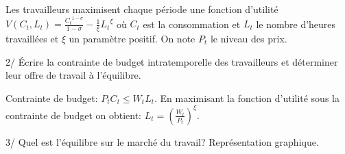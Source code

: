 \documentclass[
  letterpaper,
  DIV=11,
  numbers=noendperiod]{scrartcl}
\begin{document}
Les travailleurs maximisent chaque période une fonction d'utilité
\(V(C_t,L_t) = \frac{{C_t}^{1-\sigma}}{1-\sigma} - \frac{1}{\xi}{L_t}^{\xi}\)
où \(C_t\) est la consommation et \(L_t\) le nombre d'heures travaillées
et \(\xi\) un paramètre positif. On note \(P_t\) le niveau des prix.

2/ Écrire la contrainte de budget intratemporelle des travailleurs et
déterminer leur offre de travail à l'équilibre.

\begin{tcolorbox}[enhanced jigsaw, colbacktitle=quarto-callout-warning-color!10!white, rightrule=.15mm, left=2mm, leftrule=.75mm, colframe=quarto-callout-warning-color-frame, titlerule=0mm, colback=white, toptitle=1mm, bottomtitle=1mm, breakable, coltitle=black, title=\textcolor{quarto-callout-warning-color}{\faExclamationTriangle}\hspace{0.5em}{Correction}, bottomrule=.15mm, opacityback=0, arc=.35mm, toprule=.15mm, opacitybacktitle=0.6]

Contrainte de budget: \(P_t C_t \leq W_t L_t\). En maximisant la
fonction d'utilité sous la contrainte de budget on obtient:
\(L_t = \left(\frac{W_t}{P_t}\right)^{\xi}\).

\end{tcolorbox}

3/ Quel est l'équilibre sur le marché du travail? Représentation
graphique.
\end{document}
